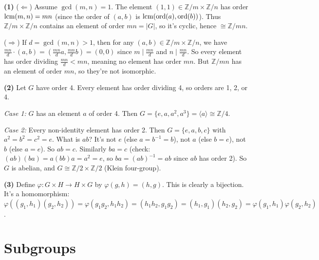 \documentclass{report}
\begin{document}
\begin{solution}
\textbf{(1)} (\(\Leftarrow\)) Assume \(\gcd(m,n) = 1\). The element \((1, 1) \in \mathbb{Z}/m \times \mathbb{Z}/n\) has order \(\operatorname*{lcm}(m, n) = mn\) (since the order of \((a, b)\) is \(\operatorname*{lcm}(\operatorname{ord}(a), \operatorname{ord}(b))\)). Thus \(\mathbb{Z}/m \times \mathbb{Z}/n\) contains an element of order \(mn = |G|\), so it's cyclic, hence \(\cong \mathbb{Z}/mn\).

(\(\Rightarrow\)) If \(d = \gcd(m, n) > 1\), then for any \((a, b) \in \mathbb{Z}/m \times \mathbb{Z}/n\), we have \(\frac{mn}{d} \cdot (a, b) = (\frac{mn}{d} a, \frac{mn}{d} b) = (0, 0)\) since \(m \mid \frac{mn}{d}\) and \(n \mid \frac{mn}{d}\). So every element has order dividing \(\frac{mn}{d} < mn\), meaning no element has order \(mn\). But \(\mathbb{Z}/mn\) has an element of order \(mn\), so they're not isomorphic.

\textbf{(2)} Let \(G\) have order 4. Every element has order dividing 4, so orders are 1, 2, or 4.

\emph{Case 1:} \(G\) has an element \(a\) of order 4. Then \(G = \{e, a, a^2, a^3\} = \langle a \rangle \cong \mathbb{Z}/4\).

\emph{Case 2:} Every non-identity element has order 2. Then \(G = \{e, a, b, c\}\) with \(a^2 = b^2 = c^2 = e\). What is \(ab\)? It's not \(e\) (else \(a = b^{-1} = b\)), not \(a\) (else \(b = e\)), not \(b\) (else \(a = e\)). So \(ab = c\). Similarly \(ba = c\) (check: \((ab)(ba) = a(bb)a = a^2 = e\), so \(ba = (ab)^{-1} = ab\) since \(ab\) has order 2). So \(G\) is abelian, and \(G \cong \mathbb{Z}/2 \times \mathbb{Z}/2\) (Klein four-group).

\textbf{(3)} Define \(\varphi : G \times H \to H \times G\) by \(\varphi(g, h) = (h, g)\). This is clearly a bijection. It's a homomorphism: \(\varphi((g_1, h_1)(g_2, h_2)) = \varphi(g_1g_2, h_1h_2) = (h_1h_2, g_1g_2) = (h_1, g_1)(h_2, g_2) = \varphi(g_1, h_1)\varphi(g_2, h_2)\).
\end{solution}

\section{Subgroups}

\end{document}
